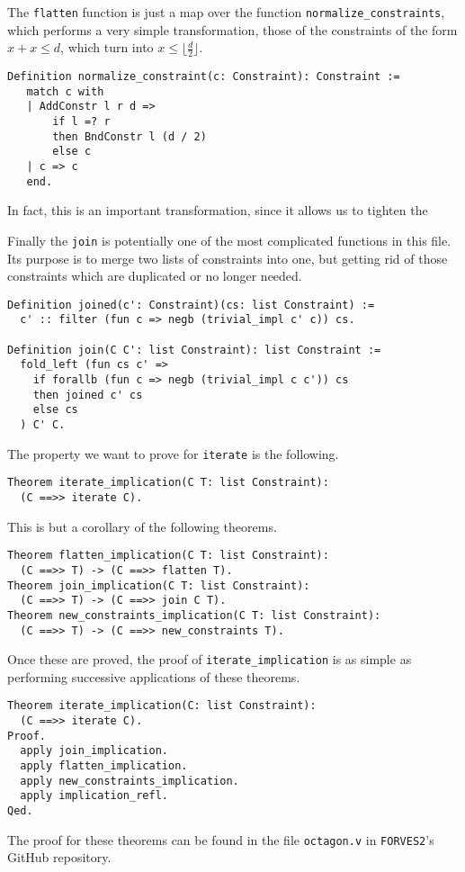 The \texttt{flatten} function is just a map over the function 
\texttt{normalize_constraints}, which performs a very simple transformation, those of 
the constraints of the form $x + x \le d$, which turn into $x \le \lfloor \frac{d}{2}\rfloor$.

\begin{verbatim}
Definition normalize_constraint(c: Constraint): Constraint :=
   match c with
   | AddConstr l r d => 
       if l =? r 
       then BndConstr l (d / 2)
       else c
   | c => c
   end.
\end{verbatim}

In fact, this is an important transformation, since it allows us to tighten the 

Finally the \texttt{join} is potentially one of the most complicated functions in this file.
Its purpose is to merge two lists of constraints into one, but getting rid of those constraints which 
are duplicated or no longer needed.

\begin{verbatim}
Definition joined(c': Constraint)(cs: list Constraint) :=
  c' :: filter (fun c => negb (trivial_impl c' c)) cs.

Definition join(C C': list Constraint): list Constraint :=
  fold_left (fun cs c' => 
    if forallb (fun c => negb (trivial_impl c c')) cs
    then joined c' cs
    else cs
  ) C' C.
\end{verbatim}

The property we want to prove for \texttt{iterate} is the following.

\begin{verbatim}
Theorem iterate_implication(C T: list Constraint):
  (C ==>> iterate C).
\end{verbatim}

This is but a corollary of the following theorems.
\begin{verbatim}
Theorem flatten_implication(C T: list Constraint):
  (C ==>> T) -> (C ==>> flatten T).
Theorem join_implication(C T: list Constraint):
  (C ==>> T) -> (C ==>> join C T).
Theorem new_constraints_implication(C T: list Constraint):
  (C ==>> T) -> (C ==>> new_constraints T).
\end{verbatim}

Once these are proved, the proof of \texttt{iterate_implication} is as simple as performing
successive applications of these theorems.
\begin{verbatim}
Theorem iterate_implication(C: list Constraint):
  (C ==>> iterate C).
Proof.
  apply join_implication.
  apply flatten_implication.
  apply new_constraints_implication.
  apply implication_refl.
Qed.
\end{verbatim}

The proof for these theorems can be found in the file \verb|octagon.v| in \verb|FORVES2|'s GitHub
repository.